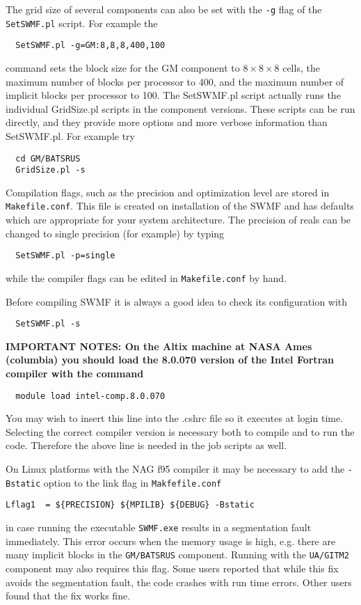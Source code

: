 The grid size of several components can also be set with the {\tt -g}
flag of the {\tt SetSWMF.pl} script. For example the 
\begin{verbatim}
  SetSWMF.pl -g=GM:8,8,8,400,100
\end{verbatim}
command sets the block size for the GM component to $8\times 8\times 8$ cells, 
the maximum number of blocks per processor to 400, 
and the maximum number of implicit blocks per processor to 100.
The SetSWMF.pl script actually runs the individual GridSize.pl
scripts in the component versions. These scripts can be run directly,
and they provide more options and more verbose information than SetSWMF.pl.
For example try
\begin{verbatim}
  cd GM/BATSRUS
  GridSize.pl -s
\end{verbatim}
Compilation flags, such as the precision and optimization 
level are stored in {\tt Makefile.conf}. This file is created on
installation of the SWMF and has defaults which are appropriate for
your system architecture.  The precision of reals
can be changed to single precision (for example) by typing
\begin{verbatim}
  SetSWMF.pl -p=single
\end{verbatim}
while the compiler flags can be edited in {\tt Makefile.conf} by hand.

Before compiling SWMF it is always a good idea to check its configuration
with
\begin{verbatim}
  SetSWMF.pl -s
\end{verbatim}

{\bf IMPORTANT NOTES:
On the Altix machine at NASA Ames (columbia)
you should load the 8.0.070 version 
of the Intel Fortran compiler 
with the command
\begin{verbatim}
  module load intel-comp.8.0.070
\end{verbatim}
You may wish to insert this line into the .cshrc file
so it executes at login time. 
Selecting the correct compiler version is 
necessary both to compile and to run the code.
Therefore the above line is needed in the job scripts
as well.

On Linux platforms with the NAG f95 compiler it may be necessary
to add the {\tt -Bstatic} option to the link flag in {\tt Makfefile.conf}
\begin{verbatim}
Lflag1  = ${PRECISION} ${MPILIB} ${DEBUG} -Bstatic
\end{verbatim} 
in case running the executable {\tt SWMF.exe}
results in a segmentation fault immediately. This error occurs when 
the memory usage is high, e.g. there are many implicit blocks in 
the {\tt GM/BATSRUS} component. Running with the {\tt UA/GITM2} component 
may also requires this flag. Some users reported
that while this fix avoids the segmentation fault, the code crashes 
with run time errors. Other users found that the fix works fine.
}

